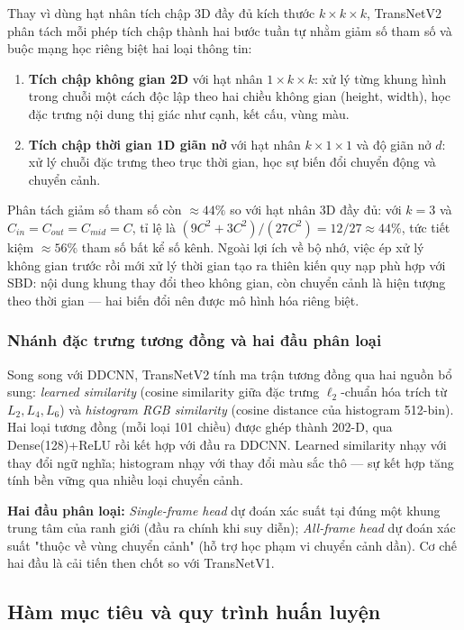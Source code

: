 Thay vì dùng hạt nhân tích chập 3D đầy đủ kích thước $k \times k \times k$, TransNetV2 phân tách mỗi phép tích chập thành hai bước tuần tự nhằm giảm số tham số và buộc mạng học riêng biệt hai loại thông tin:
\begin{enumerate}
    \item \textbf{Tích chập không gian 2D} với hạt nhân $1 \times k \times k$: xử lý từng khung hình trong chuỗi một cách độc lập theo hai chiều không gian (height, width), học đặc trưng nội dung thị giác như cạnh, kết cấu, vùng màu.
    \item \textbf{Tích chập thời gian 1D giãn nở} với hạt nhân $k \times 1 \times 1$ và độ giãn nở $d$: xử lý chuỗi đặc trưng theo trục thời gian, học sự biến đổi chuyển động và chuyển cảnh.
\end{enumerate}

Phân tách giảm số tham số còn $\approx 44\%$ so với hạt nhân 3D đầy đủ: với $k=3$ và $C_{in}=C_{out}=C_{mid}=C$, tỉ lệ là $(9C^2+3C^2)/(27C^2)=12/27\approx44\%$, tức tiết kiệm $\approx56\%$ tham số bất kể số kênh. Ngoài lợi ích về bộ nhớ, việc ép xử lý không gian trước rồi mới xử lý thời gian tạo ra thiên kiến quy nạp phù hợp với SBD: nội dung khung thay đổi theo không gian, còn chuyển cảnh là hiện tượng theo thời gian — hai biến đổi nên được mô hình hóa riêng biệt.

\subsubsection{Nhánh đặc trưng tương đồng và hai đầu phân loại}
\label{subsubsec:similarity_branch}

Song song với DDCNN, TransNetV2 tính ma trận tương đồng qua hai nguồn bổ sung: \textit{learned similarity} (cosine similarity giữa đặc trưng $\ell_2$-chuẩn hóa trích từ $L_2,L_4,L_6$) và \textit{histogram RGB similarity} (cosine distance của histogram 512-bin). Hai loại tương đồng (mỗi loại 101 chiều) được ghép thành 202-D, qua Dense(128)+ReLU rồi kết hợp với đầu ra DDCNN. Learned similarity nhạy với thay đổi ngữ nghĩa; histogram nhạy với thay đổi màu sắc thô — sự kết hợp tăng tính bền vững qua nhiều loại chuyển cảnh.

\textbf{Hai đầu phân loại:} \textit{Single-frame head} dự đoán xác suất tại đúng một khung trung tâm của ranh giới (đầu ra chính khi suy diễn); \textit{All-frame head} dự đoán xác suất "thuộc về vùng chuyển cảnh" (hỗ trợ học phạm vi chuyển cảnh dần). Cơ chế hai đầu là cải tiến then chốt so với TransNetV1.

\subsection{Hàm mục tiêu và quy trình huấn luyện}
\label{subsec:transnetv2_training}

